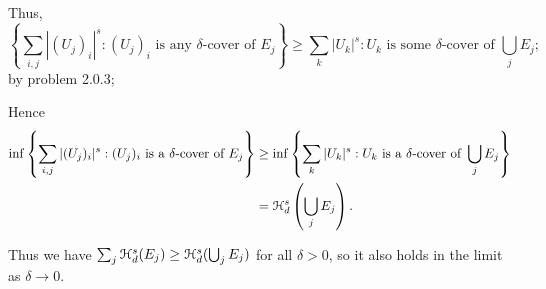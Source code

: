\begin{enumerate}
    Thus, 
    \[ \left\{ \sum_{i,j} |(U_j)_i|^s : (U_j)_i \text{ is any }\delta\text{-cover of } E_j \right\} \geq  \sum_{k} |U_k|^s: U_k  \text{ is some }\delta\text{-cover of } \bigcup_j E_j;\]
    by problem 2.0.3;
    
    Hence
    \begin{align*}
        \inf \left\{ \sum_{i,j} |(U_j)_i|^s : (U_j)_i \text{ is a }\delta\text{-cover of } E_j \right\} &\geq \inf \left\{\sum_k |U_k|^s: U_k  \text{ is a }\delta\text{-cover of } \bigcup_j E_j\right\}\\
        &= \mathcal{H}_d^s\left(\bigcup_j E_j\right).
    \end{align*}
    
    Thus we have \(\sum_j \mathcal{H}_d^s(E_j) \geq  \mathcal{H}_d^s(\bigcup_j E_j)\) for all \(\delta > 0\), so it also holds in the limit as \(\delta \to 0\).

\end{enumerate}
